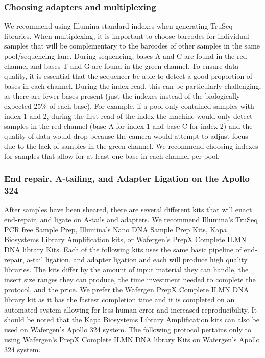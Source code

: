 \documentclass[graybox]{svmult}
\begin{document}
\subsubsection{Choosing adapters and multiplexing}

We recommend using Illumina standard indexes when generating TruSeq libraries. When multiplexing, it is important to choose barcodes for individual samples that will be complementary to the barcodes of other samples in the same pool/sequencing lane. During sequencing, bases A and C are found in the red channel and bases T and G are found in the green channel. To ensure data quality, it is essential that the sequencer be able to detect a good proportion of bases in each channel. During the index read, this can be particularly challenging, as there are fewer bases present (just the indexes instead of the biologically expected 25\% of each base). For example, if a pool only contained samples with index 1 and 2, during the first read of the index the machine would only detect samples in the red channel (base A for index 1 and base C for index 2) and the quality of data would drop because the camera would attempt to adjust focus due to the lack of samples in the green channel. We recommend choosing indexes for samples that allow for at least one base in each channel per pool.

\subsubsection{End repair, A-tailing, and Adapter Ligation on the Apollo 324}

After samples have been sheared, there are several different kits that will enact end-repair, and ligate on A-tails and adapters. We recommend Illumina’s TruSeq PCR free Sample Prep, Illumina’s Nano DNA Sample Prep Kits, Kapa Biosystems Library Amplification kits, or Wafergen’s PrepX Complete ILMN DNA library Kits. Each of the following kits uses the same basic pipeline of end-repair, a-tail ligation, and adapter ligation and each will produce high quality libraries. The kits differ by the amount of input material they can handle, the insert size ranges they can produce, the time investment needed to complete the protocol, and the price. We prefer the Wafergen PrepX Complete ILMN DNA library kit as it has the fastest completion time and it is completed on an automated system allowing for less human error and increased reproducibility. It should be noted that the Kapa Biosystems Library Amplification kits can also be used on Wafergen’s Apollo 324 system. The following protocol pertains only to using Wafergen’s PrepX Complete ILMN DNA library Kits on Wafergen’s Apollo 324 system.
\end{document}
